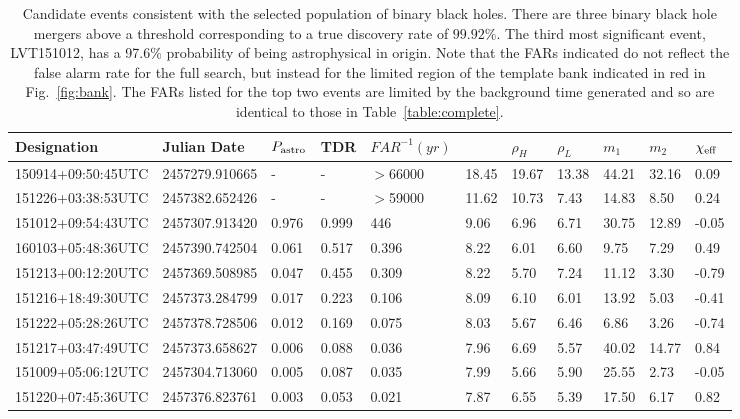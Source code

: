 \newpage
\begin{table}
  \begin{center}
    \caption{Candidate events consistent with the selected population of binary black holes. There are three binary black hole mergers above a threshold corresponding to a true discovery rate of $99.92\%$. The third most significant event, LVT151012, has a 97.6\% probability of
    being astrophysical in origin. Note that the FARs indicated do not reflect the false alarm rate for the full search, but instead for the limited region of the template bank indicated in red in Fig.~\ref{fig:bank}. The FARs listed for the top two events are limited
    by the background time generated and so are identical to those in Table~\ref{table:complete}.}
    \label{table:bbh}
  \end{center}
\begin{tabularx}{1.0\textwidth}{lllllllllll}
Designation & Julian Date & $P_{\mathrm{astro}}{}$ & TDR & $FAR^{-1} (yr)$ & \rankingstat{} & $\rho_H$ & $\rho_L$ & $m_1$ & $m_2$ & $\chi_{\mathrm{eff}}{}$ \\ \hline
150914+09:50:45UTC & 2457279.910665 & - & - &  $>$66000 & 18.45 & 19.67 & 13.38 & 44.21 & 32.16 & 0.09\\
151226+03:38:53UTC & 2457382.652426 & - & - &  $>$59000 & 11.62 & 10.73 & 7.43 & 14.83 & 8.50 & 0.24\\
151012+09:54:43UTC & 2457307.913420 & 0.976 & 0.999 &    446 & 9.06 & 6.96 & 6.71 & 30.75 & 12.89 & -0.05\\
160103+05:48:36UTC & 2457390.742504 & 0.061 & 0.517 &      0.396 & 8.22 & 6.01 & 6.60 & 9.75 & 7.29 & 0.49\\
151213+00:12:20UTC & 2457369.508985 & 0.047 & 0.455 &      0.309 & 8.22 & 5.70 & 7.24 & 11.12 & 3.30 & -0.79\\
151216+18:49:30UTC & 2457373.284799 & 0.017 & 0.223 &      0.106 & 8.09 & 6.10 & 6.01 & 13.92 & 5.03 & -0.41\\
151222+05:28:26UTC & 2457378.728506 & 0.012 & 0.169 &      0.075 & 8.03 & 5.67 & 6.46 & 6.86 & 3.26 & -0.74\\
151217+03:47:49UTC & 2457373.658627 & 0.006 & 0.088 &      0.036 & 7.96 & 6.69 & 5.57 & 40.02 & 14.77 & 0.84\\
151009+05:06:12UTC & 2457304.713060 & 0.005 & 0.087 &      0.035 & 7.99 & 5.66 & 5.90 & 25.55 & 2.73 & -0.05\\
151220+07:45:36UTC & 2457376.823761 & 0.003 & 0.053 &      0.021 & 7.87 & 6.55 & 5.39 & 17.50 & 6.17 & 0.82\\

\end{tabularx}
\end{table}
